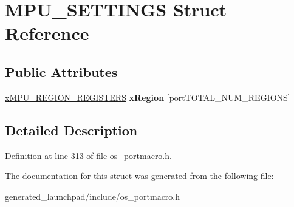 \hypertarget{structMPU__SETTINGS}{}\section{M\+P\+U\+\_\+\+S\+E\+T\+T\+I\+N\+GS Struct Reference}
\label{structMPU__SETTINGS}
\subsection*{Public Attributes}
\begin{DoxyCompactItemize}
\item 
\mbox{\label{structMPU__SETTINGS_aee3b73ca987a7d370e04662b32d20857}} 
\mbox{\hyperlink{structMPU__REGION__REGISTERS}{x\+M\+P\+U\+\_\+\+R\+E\+G\+I\+O\+N\+\_\+\+R\+E\+G\+I\+S\+T\+E\+RS}} {\bfseries x\+Region} \mbox{[}port\+T\+O\+T\+A\+L\+\_\+\+N\+U\+M\+\_\+\+R\+E\+G\+I\+O\+NS\mbox{]}
\end{DoxyCompactItemize}


\subsection{Detailed Description}


Definition at line 313 of file os\+\_\+portmacro.\+h.



The documentation for this struct was generated from the following file\+:\begin{DoxyCompactItemize}
\item 
generated\+\_\+launchpad/include/os\+\_\+portmacro.\+h\end{DoxyCompactItemize}
